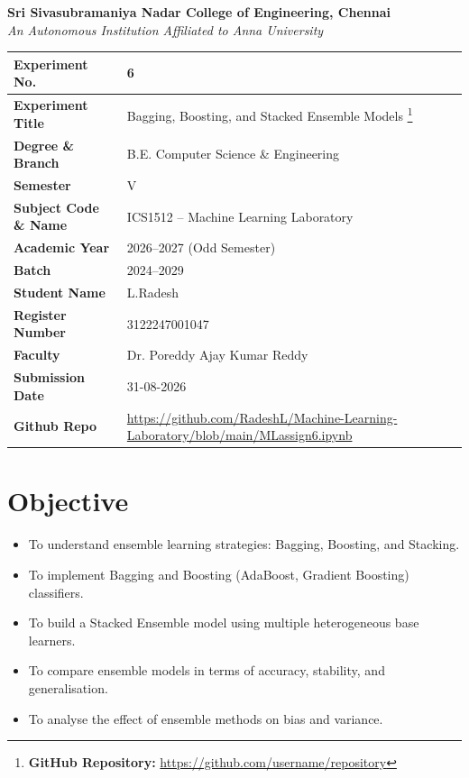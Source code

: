 \documentclass[12pt,a4paper]{article}
\begin{document}
\begin{center}
  \textbf{\large Sri Sivasubramaniya Nadar College of Engineering, Chennai}\\[4pt]
  \textit{An Autonomous Institution Affiliated to Anna University}\\[12pt]
\end{center}

\begin{tabular}{|p{4.5cm}|p{10.5cm}|}
\hline
\textbf{Experiment No.}       & 6 \\ \hline
\textbf{Experiment Title}     & Bagging, Boosting, and Stacked Ensemble Models%
  \footnote{\textbf{GitHub Repository:} \url{https://github.com/username/repository}} \\ \hline
\textbf{Degree \& Branch}     & B.E. Computer Science \& Engineering \\ \hline
\textbf{Semester}             & V \\ \hline
\textbf{Subject Code \& Name} & ICS1512 -- Machine Learning Laboratory \\ \hline
\textbf{Academic Year}        & 2026--2027 (Odd Semester) \\ \hline
\textbf{Batch}                & 2024--2029 \\ \hline
\textbf{Student Name}         & L.Radesh \\ \hline
\textbf{Register Number}      & 3122247001047 \\ \hline
\textbf{Faculty}              & Dr. Poreddy Ajay Kumar Reddy \\ \hline
\textbf{Submission Date}      & 31-08-2026 \\ \hline
\textbf{Github Repo}      & \url{ https://github.com/RadeshL/Machine-Learning-Laboratory/blob/main/MLassign6.ipynb}\\ \hline
\end{tabular}
\vspace{1cm}

\section{Objective}
\begin{itemize}[noitemsep]
  \item To understand ensemble learning strategies: Bagging, Boosting, and Stacking.
  \item To implement Bagging and Boosting (AdaBoost, Gradient Boosting) classifiers.
  \item To build a Stacked Ensemble model using multiple heterogeneous base learners.
  \item To compare ensemble models in terms of accuracy, stability, and generalisation.
  \item To analyse the effect of ensemble methods on bias and variance.
\end{itemize}
\end{document}
